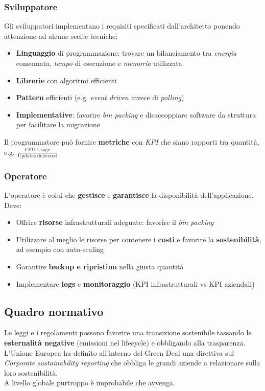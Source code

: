 \subsubsection{Sviluppatore}
Gli sviluppatori implementano i requisiti specificati dall'architetto ponendo attenzione ad alcune scelte tecniche:
\begin{itemize}
	\item \textbf{Linguaggio} di programmazione: trovare un bilanciamento tra \emph{energia} consumata, \emph{tempo} di esecuzione e \emph{memoria} utilizzata
	\item \textbf{Librerie} con algoritmi efficienti
	\item \textbf{Pattern} efficienti (e.g. \emph{event driven} invece di \emph{polling})
	\item \textbf{Implementative}: favorire \emph{bin packing} e disaccoppiare software da struttura per facilitare la migrazione
\end{itemize}
Il programmatore può fornire \textbf{metriche} con \emph{KPI} che siano rapporti tra quantità, e.g. $\frac{\text{CPU Usage}}{\text{Updates delivered}}$
\subsubsection{Operatore}
L'operatore è colui che \textbf{gestisce} e \textbf{garantisce} la disponibilità dell'applicazione. Deve:
\begin{itemize}
	\item Offrire \textbf{risorse} infrastrutturali adeguate: favorire il \emph{bin packing}
	\item Utilizzare al meglio le risorse per contenere i \textbf{costi} e favorire la \textbf{sostenibilità}, ad esempio con auto-scaling
	\item Garantire \textbf{backup e ripristino} nella giusta quantità
	\item Implementare \textbf{logs} e \textbf{monitoraggio} (KPI infrastrutturali vs KPI aziendali)
\end{itemize}

\subsection{Quadro normativo}
Le leggi e i regolamenti possono favorire  una transizione sostenibile tassando le \textbf{esternalità negative} (emissioni nel lifecycle) e obbligando alla trasparenza.\\
L'Unione Europea ha definito all'interno del Green Deal una direttiva sul \emph{Corporate sustainability reporting} che obbliga le grandi aziende a relazionare sulla loro sostenibilità.\\
A livello globale purtroppo è improbabile che avvenga.